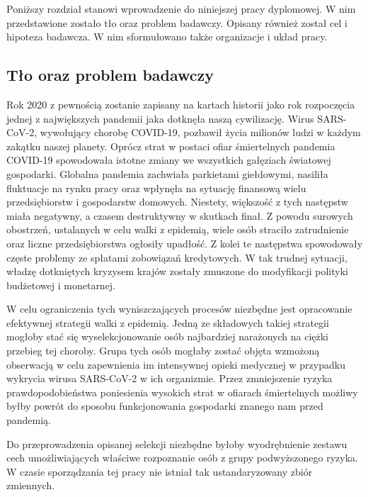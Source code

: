 \documentclass[polish, twoside, 12pt, a4paper]{article}
\theoremstyle{definition}
\theoremstyle{plain}
\theoremstyle{remark}
\begin{document}


Poniższy rozdział stanowi wprowadzenie do niniejszej pracy dyplomowej. W nim przedstawione zostało tło oraz problem badawczy. Opisany również został cel i hipoteza badawcza. W nim sformułowano także organizacje i układ pracy.  

\subsection{Tło oraz problem badawczy}

Rok 2020 z pewnością zostanie zapisany na kartach historii jako rok rozpoczęcia jednej z największych pandemii jaka dotknęła naszą cywilizację. Wirus SARS-CoV-2, wywołujący chorobę COVID-19, pozbawił życia milionów ludzi w każdym zakątku naszej planety. Oprócz strat w postaci ofiar śmiertelnych pandemia COVID-19 spowodowała istotne zmiany we wszystkich gałęziach światowej gospodarki. Globalna pandemia zachwiała parkietami giełdowymi, nasiliła fluktuacje na rynku pracy oraz wpłynęła na sytuację finansową wielu przedsiębiorstw i gospodarstw domowych. Niestety, większość z tych następstw miała negatywny, a czasem destruktywny w skutkach finał. Z powodu surowych obostrzeń, ustalanych w celu walki z epidemią, wiele osób straciło zatrudnienie oraz liczne przedsiębiorstwa ogłosiły upadłość. Z kolei te następstwa spowodowały częste problemy ze spłatami zobowiązań kredytowych. W tak trudnej sytuacji, władzę dotkniętych kryzysem krajów zostały zmuszone do modyfikacji polityki budżetowej i monetarnej.  

W celu ograniczenia tych wyniszczających procesów niezbędne jest opracowanie efektywnej strategii walki z epidemią. Jedną ze składowych takiej strategii mogłoby stać się wyselekcjonowanie osób najbardziej narażonych na ciężki przebieg tej choroby. Grupa tych osób mogłaby zostać objęta wzmożoną obserwacją w celu zapewnienia im intensywnej opieki medycznej w przypadku wykrycia wirusa SARS-CoV-2 w ich organizmie. Przez zmniejszenie ryzyka prawdopodobieństwa poniesienia wysokich strat w ofiarach śmiertelnych możliwy byłby powrót do sposobu funkcjonowania gospodarki znanego nam przed pandemią. 

Do przeprowadzenia opisanej selekcji niezbędne byłoby wyodrębnienie zestawu cech umożliwiających właściwe rozpoznanie osób z grupy podwyższonego ryzyka. W czasie sporządzania tej pracy nie istniał tak ustandaryzowany zbiór zmiennych.
\end{document}
